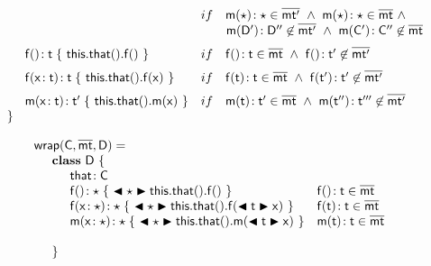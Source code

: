 \documentclass[acmlarge, anonymous, authordraft]{acmart}
\begin{document}
\[\begin{array}{@{}ll@{}l@{}r@{~}c@{~}r}
&    if\,\,\,\,\,\, \Mtype\m\any\any\in\bmtp ~\wedge~ \Mtype\m\any\any\in\bmt ~\wedge~  \\
&     \multicolumn{5}{l}{\qquad \Mtype\m\Dp\Dpp\not\in\bmtp ~\wedge~ \Mtype\m\Cp\Cpp\not\in\bmt} \\
\\[-2mm]
\SPP \Mdefz\f\t { ~\Get{\Get\this\that}\f~}
&    if\,\,\,\,\,\, \Mtype\f{}\t \in \bmt ~\wedge~ \Mtype\f{}\tp \not\in \bmtp \\
\\[-2mm]
\SPP \Mdef\f\x\t\t { ~\Set{\Get\this\that}\f\x~}
&    if\,\,\,\,\,\, \Mtype\f\t\t \in \bmt~\wedge~ \Mtype\f\tp\tp \not\in \bmtp \\
\\[-2mm]
\SPP \Mdef\m\x{\t}{\tp}{~\Set{\Get\this\that}\m{\x}~}
&    if\,\,\,\,\,\, \Mtype\m\t\tp\in\bmt ~\wedge~ \Mtype\m\tpp\tppp\not\in \bmtp \\
\SP \}
\\
\end{array}\]

\[\begin{array}{@{}ll@{}l@{}r@{~}c@{~}r}
\wrapAny\C\bmt\D = \\
\SP \class~\D~\{\\
\SPP \Fdef \that \C\\ 
\SPP   \Mdefz\f\any{~\BehCast\any{\Get{{\Get\this\that}}\f}~}
&  \Mtype\f{}\t \in \bmt\\
\SPP   \Mdef\f\x\any\any{~\BehCast\any{\Set{\Get\this\that}\f{\bscast\t\x}}~}
&  \Mtype\f\t\t \in \bmt\\
\SPP   \Mdef\m\x\any\any {~\bscast\any{\Call{\Get\this\that}\m{\bscast{\t}\x} }~}
&  \Mtype\m\t\t\in\b\mt \\
\\
\SP \}\\
\end{array}\]



\end{document}
